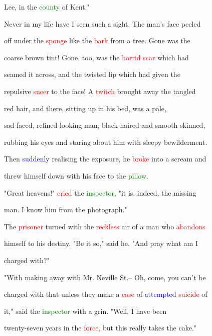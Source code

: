  Lee, in the \textcolor{green}{county} of Kent."



 Never in my life have I seen such a sight. The man's face peeled

 off under the \textcolor{red}{sponge} like the \textcolor{red}{bark} from a \textcolor{BurntOrange}{tree.} Gone was the

 coarse brown tint! Gone, too, was the \textcolor{red}{horrid} \textcolor{red}{scar} which had

 seamed it across, and the twisted lip which had given the

 repulsive \textcolor{red}{sneer} to the face! A \textcolor{red}{twitch} brought away the tangled

 red hair, and there, sitting up in his bed, was a pale,

 sad-faced, refined-looking man, black-haired and smooth-skinned,

 rubbing his eyes and \textcolor{BurntOrange}{staring} about him with sleepy \textcolor{BurntOrange}{bewilderment.}

 Then \textcolor{blue}{suddenly} realising the exposure, he \textcolor{red}{broke} into a \textcolor{BurntOrange}{scream} and

 threw himself down with his face to the \textcolor{green}{pillow.}



 "Great heavens!" \textcolor{red}{cried} the \textcolor{green}{inspector,} "it is, indeed, the missing

 man. I know him from the photograph."



 The \textcolor{red}{prisoner} turned with the \textcolor{red}{reckless} air of a man who \textcolor{red}{abandons}

 himself to his destiny. "Be it so," said he. "And \textcolor{BurntOrange}{pray} what am I

 charged with?"



 "With making away with Mr. Neville St.-- Oh, come, you can't be

 charged with that unless they make a \textcolor{red}{case} of \textcolor{blue}{attempted} \textcolor{red}{suicide} of

 it," said the \textcolor{green}{inspector} with a \textcolor{BurntOrange}{grin.} "Well, I have been

 twenty-seven years in the \textcolor{red}{force,} but this really takes the cake."



